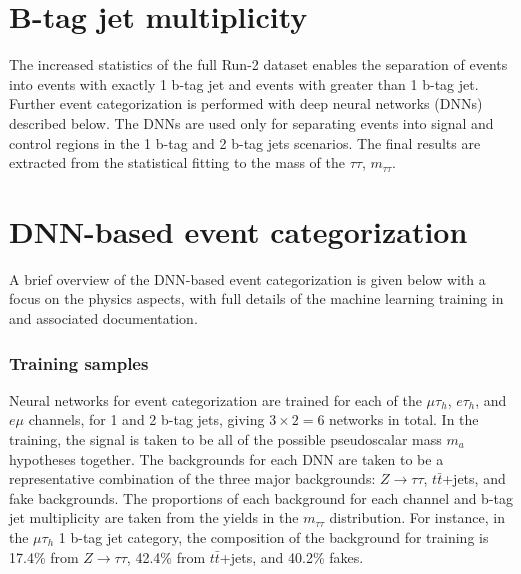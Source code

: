 \section{B-tag jet multiplicity}
The increased statistics of the full Run-2 dataset enables the separation of events into events with exactly 1 b-tag jet and events with greater than 1 b-tag jet. Further event categorization is performed with deep neural networks (DNNs) described below. The DNNs  are used only for separating events into signal and control regions in the 1 b-tag and 2 b-tag jets scenarios. The final results are extracted from the statistical fitting to the mass of the $\tau\tau$, $m_{\tau\tau}$.

\section{DNN-based event categorization}
A brief overview of the DNN-based event categorization is given below with a focus on the physics aspects, with full details of the machine learning training in \cite{CMS-HIG-22-007} and associated documentation.

\subsubsection{Training samples}
Neural networks for event categorization are trained for each of the $\mu\tau_{h}$, $e\tau_{h}$, and $e\mu$ channels, for 1 and 2 b-tag jets, giving $3 \times 2 = 6$ networks in total. In the training, the signal is taken to be all of the possible pseudoscalar mass $m_{a}$ hypotheses together. The backgrounds for each DNN are taken to be a representative combination of the three major backgrounds: $Z \rightarrow \tau\tau$, $t\bar{t}$+jets, and fake backgrounds. The proportions of each background for each channel and b-tag jet multiplicity are taken from the yields in the $m_{\tau\tau}$ distribution. For instance, in the $\mu\tau_{h}$ 1 b-tag jet category, the composition of the background for training is 17.4\% from $Z \rightarrow \tau\tau$, 42.4\% from $t\bar{t}$+jets, and 40.2\% fakes.

